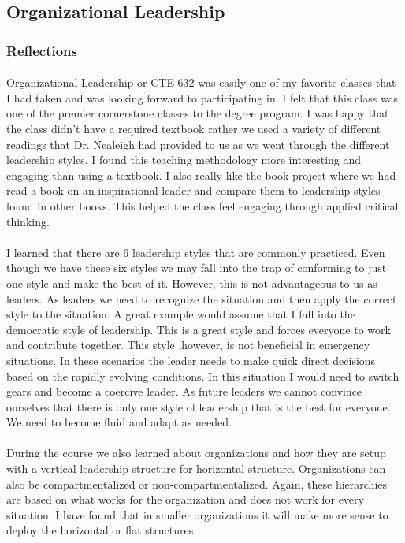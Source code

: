 \documentclass[12pt,titlepage]{article}
\begin{document}
\subsection{Organizational Leadership}
\subsubsection{Reflections}
\paragraph {}
Organizational Leadership or CTE 632 was easily one of my favorite classes that I had taken and was looking forward to participating in. I felt that this class was one of the premier cornerstone classes to the degree program. I was happy that the class didn't have a required textbook rather we used a variety of different readings that Dr. Nealeigh had provided to us as we went through the different leadership styles. I found this teaching methodology more interesting and engaging than using a textbook. I also really like the book project where we had read a book on an inspirational leader and compare them to leadership styles found in other books. This helped the class feel engaging through applied critical thinking.
\paragraph {}
I learned that there are 6 leadership styles that are commonly practiced. Even though we have these six styles we may fall into the trap of conforming to just one style and make the best of it. However, this is not advantageous to us as leaders. As leaders we need to recognize the situation and then apply the correct style to the situation. A great example would assume that I fall into the democratic style of leadership. This is a great style and forces everyone to work and contribute together. This style ,however, is not beneficial in emergency situations. In these scenarios the leader needs to make quick direct decisions based on the rapidly evolving conditions. In this situation I would need to switch gears and become a coercive leader. As future leaders we cannot convince ourselves that there is only one style of leadership that is the best for everyone. We need to become fluid and adapt as needed.
\paragraph {}
During the course we also learned about organizations and how they are setup with a vertical leadership structure for horizontal structure. Organizations can also be compartmentalized or non-compartmentalized. Again, these hierarchies are based on what works for the organization and does not work for every situation. I have found that in smaller organizations it will make more sense to deploy the horizontal or flat structures.
\end{document}
